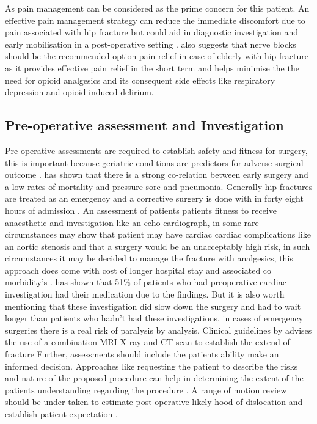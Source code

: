 \documentclass[a4paper,man,british]{apa6}
\begin{document}
As pain management can be considered as the prime concern for this patient. An effective pain management strategy can reduce the immediate discomfort due to pain associated with hip fracture but could aid in diagnostic investigation and early mobilisation in a post-operative setting \parencite{fernandez_management_2015,monzon_pain_2010}. \textcite{fernandez_management_2015} also suggests that nerve blocks should be the recommended option pain relief in case of elderly with hip fracture as it provides effective pain relief in the short term and helps minimise the the need for opioid analgesics and its consequent side effects like respiratory depression and opioid induced delirium.

\subsection{Pre-operative assessment and Investigation}

Pre-operative assessments are required to establish safety and fitness for surgery, this is important because geriatric conditions are predictors for adverse surgical outcome \parencite{oresanya_preoperative_2014}. \textcite{simunovic_effect_2010} has shown that there is a strong co-relation between early surgery and a low rates of mortality and pressure sore and pneumonia. Generally hip fractures are treated as an emergency and a corrective surgery is done with in forty eight hours of admission \parencite{siu_preoperative_2010}. An assessment of patients  patients fitness to receive anaesthetic and investigation like an echo cardiograph, in some rare circumstances may show that patient may have cardiac cardiac complications like an aortic stenosis and that a surgery would be an unacceptably high risk, in such circumstances it may be decided to manage the fracture with analgesics, this approach does come with cost of longer hospital stay and associated co morbidity's \parencite{parker_hip_2006,radford_preoperative_2011}. \textcite{oheireamhoin_role_2011} has shown that 51\% of patients who had preoperative cardiac investigation had their medication due to the findings. But it is also worth mentioning that these investigation did slow down the surgery and had to wait longer than patients who hadn't had these investigations, in cases of emergency surgeries there is a real risk of paralysis by analysis. 
Clinical guidelines by \textcite{chesser_new_2011} advises the use of a combination MRI X-ray and CT scan to establish the extend of fracture
\newline
Further, assessments should include the patients ability make an informed decision. Approaches like requesting the patient to describe the risks and nature of the proposed procedure can help in determining the extent of the patients understanding regarding the procedure \parencite{oresanya_preoperative_2014}.
A range of motion review should be under taken to estimate post-operative likely hood of dislocation and establish patient expectation \parencite{krenzel_high_2010}.
\end{document}
